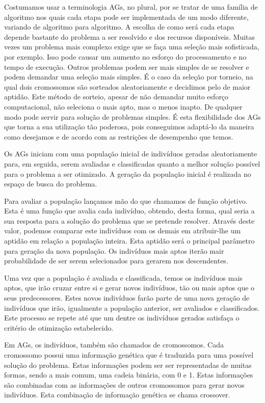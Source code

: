 \documentclass[
    12pt,               %
    oneside,%
    a4paper,            %
    english,            %
    french,             %
    spanish,            %
    brazil,             %
    ]{abntex2}
\begin{document}
  Costumamos usar a terminologia AGs, no plural, por se tratar de uma família de algoritmo nos quais cada etapa pode ser implementada de um modo diferente, variando de algoritmo para algoritmo. A escolha de como será cada etapa depende bastante do problema a ser resolvido e dos recursos disponíveis. Muitas vezes um problema mais complexo exige que se faça uma seleção mais sofisticada, por exemplo. Isso pode causar um aumento no esforço do processamento e no tempo de execução. Outros problemas podem ser mais simples de se resolver e podem demandar uma seleção mais simples. É o caso da seleção por torneio, na qual dois cromossomos são sorteados aleatoriamente e decidimos pelo de maior aptidão. Este método de sorteio, apesar de não demandar muito esforço computacional, não seleciona o mais apto, mas o menos inapto. De qualquer modo pode servir para solução de problemas simples. É esta flexibilidade dos AGs que torna a sua utilização tão poderosa, pois conseguimos adaptá-lo da maneira como desejamos e de acordo com as restrições de desempenho que temos.

  Os AGs iniciam com uma população inicial de indivíduos geradas aleatoriamente para, em seguida, serem avaliadas e classificadas quanto a melhor solução possível para o problema a ser otimizado.  A geração da população inicial é realizada no espaço de busca do problema.

  Para avaliar a população lançamos mão do que chamamos de função objetivo. Esta é uma função que avalia cada indivíduo, obtendo, desta forma, qual seria a sua resposta para a solução do problema que se pretende resolver.  Através deste valor, podemos comparar este indivíduos com os demais em atribuir-lhe um aptidão em relação a população inteira. Esta aptidão será o principal parâmetro para geração da nova população. Os indivíduos mais aptos iterão mair probabilidade de ser serem selecionados para gerarem nos descendentes.

  Uma vez que a população é avaliada e classificada, temos os indivíduos mais aptos, que irão cruzar entre si e gerar novos indivíduos, tão ou mais aptos que o seus predecessores. Estes novos indivíduos farão parte de uma nova geração de indivíduos que irão, igualmente a população anterior, ser avaliados e classificados. Este processo se repete até que um dentre os indivíduos gerados satisfaça o critério de otimização estabelecido.

  Em AGs, os indivíduos, também são chamados de cromossomos. Cada cromossomo possui uma informação genética que é traduzida para uma possível solução do problema. Estas informações podem ser ser representadas de muitas formas, sendo a mais comum, uma cadeia binária, com 0 e 1. Estas informações são combinadas com as informações de outros cromossomos para gerar novos indivíduos. Esta combinação de informação genética se chama crossover.
\end{document}
